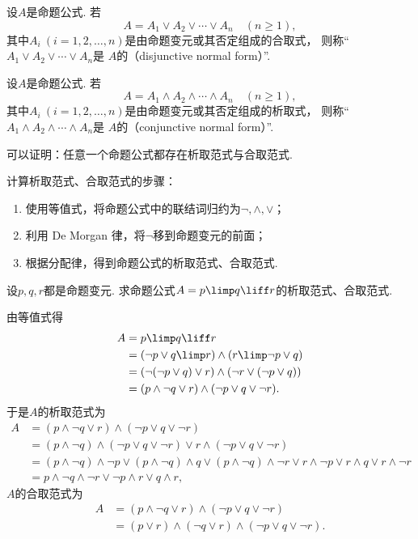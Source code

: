 \begin{definition}
设\(A\)是命题公式.
若\[
	A = A_1 \lor A_2 \lor \dotsb \lor A_n
	\quad(n\geq1),
\]
其中\(A_i\ (i=1,2,\dotsc,n)\)是由命题变元或其否定组成的合取式，
则称“\(A_1 \lor A_2 \lor \dotsb \lor A_n\)是
\(A\)的（disjunctive normal form）”.
\end{definition}

\begin{definition}
设\(A\)是命题公式.
若\[
	A = A_1 \land A_2 \land \dotsb \land A_n
	\quad(n\geq1),
\]
其中\(A_i\ (i=1,2,\dotsc,n)\)是由命题变元或其否定组成的析取式，
则称“\(A_1 \land A_2 \land \dotsb \land A_n\)是
\(A\)的（conjunctive normal form）”.
\end{definition}

可以证明：任意一个命题公式都存在析取范式与合取范式.

计算析取范式、合取范式的步骤：\begin{enumerate}
	\item 使用等值式，将命题公式中的联结词归约为\(\neg,\land,\lor\)；
	\item 利用 De Morgan 律，将\(\neg\)移到命题变元的前面；
	\item 根据分配律，得到命题公式的析取范式、合取范式.
\end{enumerate}

\begin{example}
设\(p,q,r\)都是命题变元.
求命题公式\(A = p \limp q \liff r\)的析取范式、合取范式.
\begin{solution}
由等值式得\begin{align*}
	A &= p \limp q \liff r \\
	&= (\neg p \lor q \limp r) \land (r \limp \neg p \lor q) \\
	&= (\neg(\neg p \lor q) \lor r) \land (\neg r \lor (\neg p \lor q)) \\
	&= (p \land \neg q \lor r) \land (\neg p \lor q \lor \neg r).
\end{align*}
于是\(A\)的析取范式为\begin{align*}
	A &= (p \land \neg q \lor r) \land (\neg p \lor q \lor \neg r) \\
	&= (p \land \neg q) \land (\neg p \lor q \lor \neg r)
		\lor r \land (\neg p \lor q \lor \neg r) \\
	&= (p \land \neg q) \land \neg p
		\lor (p \land \neg q) \land q
		\lor (p \land \neg q) \land \neg r
		\lor r \land \neg p
		\lor r \land q
		\lor r \land \neg r \\
	&= p \land \neg q \land \neg r
		\lor \neg p \land r
		\lor q \land r,
\end{align*}
\(A\)的合取范式为\begin{align*}
	A &= (p \land \neg q \lor r) \land (\neg p \lor q \lor \neg r) \\
	&= (p \lor r) \land (\neg q \lor r) \land (\neg p \lor q \lor \neg r).
\end{align*}
\end{solution}
\end{example}


